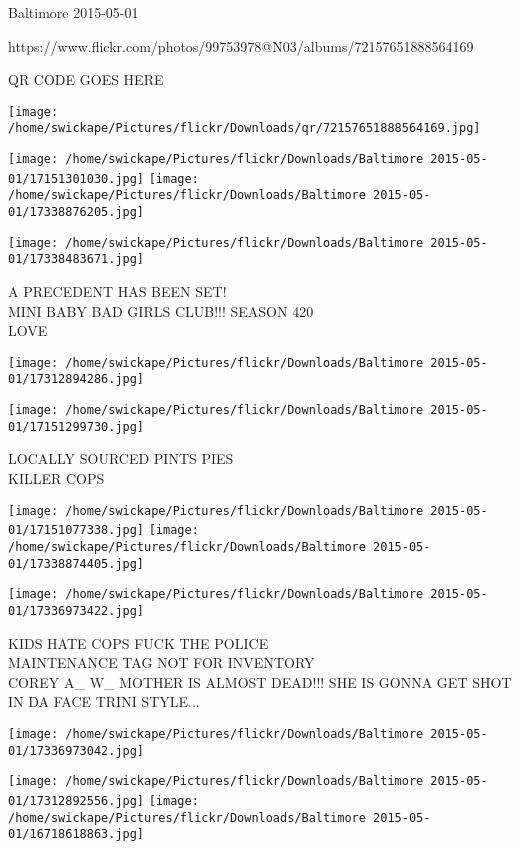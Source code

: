 \documentclass[10pt,letterpaper]{article}
\begin{document}
Baltimore 2015-05-01

https://www.flickr.com/photos/99753978@N03/albums/72157651888564169

QR CODE GOES HERE

\texttt{[image: /home/swickape/Pictures/flickr/Downloads/qr/72157651888564169.jpg]}
\pagebreak

\texttt{[image: /home/swickape/Pictures/flickr/Downloads/Baltimore 2015-05-01/17151301030.jpg]}
\texttt{[image: /home/swickape/Pictures/flickr/Downloads/Baltimore 2015-05-01/17338876205.jpg]}

\texttt{[image: /home/swickape/Pictures/flickr/Downloads/Baltimore 2015-05-01/17338483671.jpg]}

A PRECEDENT HAS BEEN SET!\\
MINI BABY BAD GIRLS CLUB!!! SEASON 420\\
LOVE\\
\pagebreak

\texttt{[image: /home/swickape/Pictures/flickr/Downloads/Baltimore 2015-05-01/17312894286.jpg]}

\vspace{0.25in}
\texttt{[image: /home/swickape/Pictures/flickr/Downloads/Baltimore 2015-05-01/17151299730.jpg]}

LOCALLY SOURCED PINTS PIES\\
KILLER COPS\\
\pagebreak

\texttt{[image: /home/swickape/Pictures/flickr/Downloads/Baltimore 2015-05-01/17151077338.jpg]}
\texttt{[image: /home/swickape/Pictures/flickr/Downloads/Baltimore 2015-05-01/17338874405.jpg]}

\vspace{0.25in}
\texttt{[image: /home/swickape/Pictures/flickr/Downloads/Baltimore 2015-05-01/17336973422.jpg]}

KIDS HATE COPS FUCK THE POLICE\\
MAINTENANCE TAG NOT FOR INVENTORY\\
COREY A\_ W\_ MOTHER IS ALMOST DEAD!!!  SHE IS GONNA GET SHOT IN DA FACE TRINI STYLE...\\
\pagebreak

\texttt{[image: /home/swickape/Pictures/flickr/Downloads/Baltimore 2015-05-01/17336973042.jpg]}

\vspace{0.25in}
\texttt{[image: /home/swickape/Pictures/flickr/Downloads/Baltimore 2015-05-01/17312892556.jpg]}
\texttt{[image: /home/swickape/Pictures/flickr/Downloads/Baltimore 2015-05-01/16718618863.jpg]}
\end{document}
